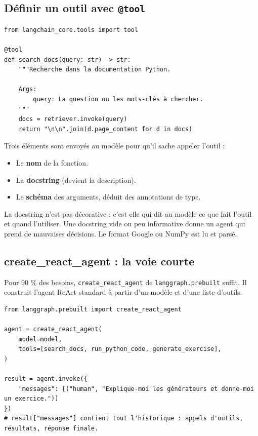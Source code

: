 \documentclass[11pt,a4paper]{article}
\begin{document}
\subsection{Définir un outil avec \texttt{@tool}}

\begin{verbatim}
from langchain_core.tools import tool

@tool
def search_docs(query: str) -> str:
    """Recherche dans la documentation Python.
    
    Args:
        query: La question ou les mots-clés à chercher.
    """
    docs = retriever.invoke(query)
    return "\n\n".join(d.page_content for d in docs)
\end{verbatim}

Trois éléments sont envoyés au modèle pour qu'il sache appeler l'outil :
\begin{itemize}
  \item Le \textbf{nom} de la fonction.
  \item La \textbf{docstring} (devient la description).
  \item Le \textbf{schéma} des arguments, déduit des annotations de type.
\end{itemize}

\begin{piege}
La docstring n'est pas décorative : c'est elle qui dit au modèle ce que fait l'outil et quand l'utiliser. Une docstring vide ou peu informative donne un agent qui prend de mauvaises décisions. Le format Google ou NumPy est lu et parsé.
\end{piege}

\subsection{create\_react\_agent : la voie courte}

Pour 90 \% des besoins, \texttt{create\_react\_agent} de \texttt{langgraph.prebuilt} suffit. Il construit l'agent ReAct standard à partir d'un modèle et d'une liste d'outils.

\begin{verbatim}
from langgraph.prebuilt import create_react_agent

agent = create_react_agent(
    model=model,
    tools=[search_docs, run_python_code, generate_exercise],
)

result = agent.invoke({
    "messages": [("human", "Explique-moi les générateurs et donne-moi un exercice.")]
})
# result["messages"] contient tout l'historique : appels d'outils, résultats, réponse finale.
\end{verbatim}
\end{document}
